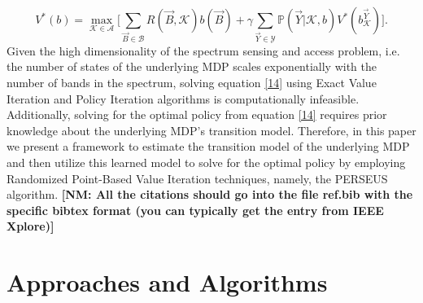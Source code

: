 \documentclass[10pt,twocolumn]{IEEEtran}
\newcommand{\nm}[1]{{\color{blue}\bf{[NM: #1]}}}
\begin{document}
\begin{equation}\label{14}
    V^*(b)=\max_{\mathcal{K}\in\mathcal{A}}\Big[\sum_{\vec{B}\in\mathcal{B}}R(\vec{B},\mathcal{K})b(\vec{B})+\gamma \sum_{\vec{Y}\in\mathcal{Y}}\mathbb{P}(\vec{Y}|\mathcal{K},b)V^*(b_{\mathcal{K}}^{\vec{Y}})\Big].
\end{equation}
Given the high dimensionality of the spectrum sensing and access problem, i.e. the number of states of the underlying MDP scales exponentially with the number of bands in the spectrum, solving equation \eqref{14} using Exact Value Iteration and Policy Iteration algorithms is computationally infeasible. Additionally, solving for the optimal policy from equation \eqref{14} requires prior knowledge about the underlying MDP's transition model. Therefore, in this paper we present a framework to estimate the transition model of the underlying MDP and then utilize this learned model to solve for the optimal policy by employing Randomized Point-Based Value Iteration techniques, namely, the PERSEUS algorithm.
\nm{All the citations should go into the file ref.bib with the specific bibtex format (you can typically get the entry from IEEE Xplore)}
\section{Approaches and Algorithms}
\end{document}
